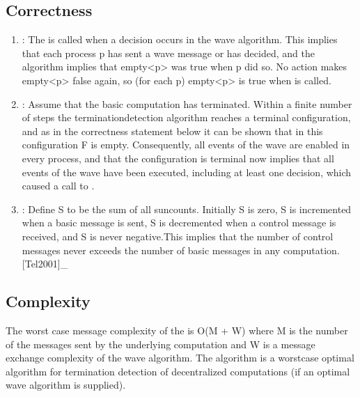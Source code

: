\documentclass[letterpaper,10pt,english]{sphinxmanual}
\begin{document}
\subsection{Correctness}
\label{\detokenize{docs/ShavitFrancezAlg/algorithm:correctness}}\begin{enumerate}
%
\item {} 
\sphinxAtStartPar
{}: The  is called when a decision occurs in the wave algorithm. This implies that each process p has sent a wave message or has decided, and the algorithm implies that empty\textless{}p\textgreater{} was true when p did so. No action makes empty\textless{}p\textgreater{} false again, so (for each p) empty\textless{}p\textgreater{} is true when  is called. 

\item {} 
\sphinxAtStartPar
{}: Assume that the basic computation has terminated. Within a finite number of steps the termination\sphinxhyphen{}detection algorithm reaches a terminal configuration, and as in the correctness statement below it can be shown that in this configuration F is empty. Consequently, all events of the wave are enabled in every process, and that the configuration is terminal now implies that all events of the wave have been executed, including at least one decision, which caused a call to . 

\item {} 
\sphinxAtStartPar
{}: Define S to be the sum of all sun\sphinxhyphen{}counts. Initially S is zero, S is incremented when a basic message is sent, S is decremented when a control message is received, and S is never negative.This implies that the number of control messages never exceeds the number of basic messages in any computation.{[}Tel2001{]}\_

\end{enumerate}


\subsection{Complexity}
\label{\detokenize{docs/ShavitFrancezAlg/algorithm:complexity}}
\sphinxAtStartPar
The worst case message complexity of the {\hyperref[\detokenize{docs/ShavitFrancezAlg/algorithm:shavitfranchesterminationdetectionalgorithm}]{}} is O(M + W) where M is the number of the messages sent by the underlying computation and W is a message exchange complexity of the wave algorithm. The algorithm is a worst\sphinxhyphen{}case optimal algorithm for termination detection of decentralized computations (if an optimal wave algorithm is supplied). 
\end{document}
